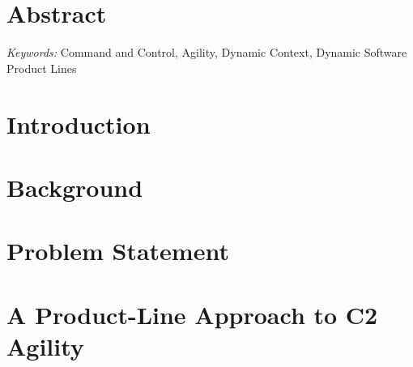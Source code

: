 \documentclass[preprint,12pt,table]{elsarticle}
\begin{document}
\begin{frontmatter}
%


\end{frontmatter}


\newpage
\section*{Abstract}

\textit{Keywords:} Command and Control, Agility, Dynamic Context, Dynamic Software Product Lines

\section{Introduction} 
\label{sec:introduction}



%


\section{Background} 
\label{sec:background}



\section{Problem Statement} 
\label{sec:example}



\section{A Product-Line Approach to C2 Agility} 
\label{sec:proposal}



%
\end{document}
